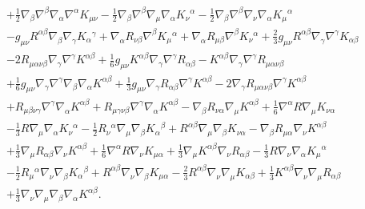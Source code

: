\begin{eqnarray}
\nonumber\\
&&+ \tfrac{1}{2} \nabla_{\beta}\nabla^{\beta}\nabla_{\alpha}\nabla^{\alpha}K_{\mu \nu} 
-  \tfrac{1}{2} \nabla_{\beta}\nabla^{\beta}\nabla_{\mu}\nabla_{\alpha}K_{\nu}{}^{\alpha} -  \tfrac{1}{2} \nabla_{\beta}\nabla^{\beta}\nabla_{\nu}\nabla_{\alpha}K_{\mu}{}^{\alpha}  
\nonumber\\
&&-  g_{\mu \nu} R^{\alpha \beta} \nabla_{\beta}\nabla_{\gamma}K_{\alpha}{}^{\gamma}  
+ \nabla_{\alpha}R_{\nu \beta} \nabla^{\beta}K_{\mu}{}^{\alpha} + \nabla_{\alpha}R_{\mu \beta} \nabla^{\beta}K_{\nu}{}^{\alpha} 
+ \tfrac{2}{3} g_{\mu \nu} R^{\alpha \beta} \nabla_{\gamma}\nabla^{\gamma}K_{\alpha \beta} 
\nonumber\\
&& - 2 R_{\mu \alpha \nu \beta} \nabla_{\gamma}\nabla^{\gamma}K^{\alpha \beta} + \tfrac{1}{6} g_{\mu \nu} K^{\alpha \beta} \nabla_{\gamma}\nabla^{\gamma}R_{\alpha \beta} -  K^{\alpha \beta} \nabla_{\gamma}\nabla^{\gamma}R_{\mu \alpha \nu \beta}  
\nonumber\\
&&+ \tfrac{1}{6} g_{\mu \nu} \nabla_{\gamma}\nabla^{\gamma}\nabla_{\beta}\nabla_{\alpha}K^{\alpha \beta} 
+ \tfrac{1}{3} g_{\mu \nu} \nabla_{\gamma}R_{\alpha \beta} \nabla^{\gamma}K^{\alpha \beta} - 2 \nabla_{\gamma}R_{\mu \alpha \nu \beta} \nabla^{\gamma}K^{\alpha \beta} 
\nonumber\\
&&+ R_{\mu \beta \nu \gamma} \nabla^{\gamma}\nabla_{\alpha}K^{\alpha \beta} + R_{\mu \gamma \nu \beta} \nabla^{\gamma}\nabla_{\alpha}K^{\alpha \beta} -  \nabla_{\beta}R_{\nu \alpha} \nabla_{\mu}K^{\alpha \beta} 
+ \tfrac{1}{6} \nabla^{\alpha}R \nabla_{\mu}K_{\nu \alpha} 
\nonumber\\
&&-  \tfrac{1}{3} R \nabla_{\mu}\nabla_{\alpha}K_{\nu}{}^{\alpha} -  \tfrac{1}{2} R_{\nu}{}^{\alpha} \nabla_{\mu}\nabla_{\beta}K_{\alpha}{}^{\beta} + R^{\alpha \beta} \nabla_{\mu}\nabla_{\beta}K_{\nu \alpha} -  \nabla_{\beta}R_{\mu \alpha} \nabla_{\nu}K^{\alpha \beta}  
\nonumber\\
&&+ \tfrac{1}{3} \nabla_{\mu}R_{\alpha \beta} \nabla_{\nu}K^{\alpha \beta} 
+ \tfrac{1}{6} \nabla^{\alpha}R \nabla_{\nu}K_{\mu \alpha} + \tfrac{1}{3} \nabla_{\mu}K^{\alpha \beta} \nabla_{\nu}R_{\alpha \beta} -  \tfrac{1}{3} R \nabla_{\nu}\nabla_{\alpha}K_{\mu}{}^{\alpha}  
\nonumber\\
&&-  \tfrac{1}{2} R_{\mu}{}^{\alpha} \nabla_{\nu}\nabla_{\beta}K_{\alpha}{}^{\beta} + R^{\alpha \beta} \nabla_{\nu}\nabla_{\beta}K_{\mu \alpha} -  \tfrac{2}{3} R^{\alpha \beta} \nabla_{\nu}\nabla_{\mu}K_{\alpha \beta} 
+ \tfrac{1}{3} K^{\alpha \beta} \nabla_{\nu}\nabla_{\mu}R_{\alpha \beta} 
\nonumber\\
&& + \tfrac{1}{3} \nabla_{\nu}\nabla_{\mu}\nabla_{\beta}\nabla_{\alpha}K^{\alpha \beta}.
\label{AP54}
\end{eqnarray}
%

